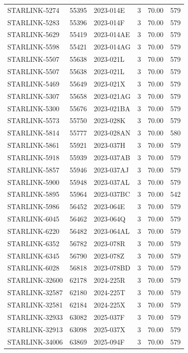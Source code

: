 \begin{longtable}{lllccc}
STARLINK-5274 & 55395 & 2023-014E & 3 & 70.00 & 579 \\
STARLINK-5283 & 55396 & 2023-014F & 3 & 70.00 & 579 \\
STARLINK-5629 & 55419 & 2023-014AE & 3 & 70.00 & 579 \\
STARLINK-5598 & 55421 & 2023-014AG & 3 & 70.00 & 579 \\
STARLINK-5507 & 55638 & 2023-021L & 3 & 70.00 & 579 \\
STARLINK-5507 & 55638 & 2023-021L & 3 & 70.00 & 579 \\
STARLINK-5469 & 55649 & 2023-021X & 3 & 70.00 & 579 \\
STARLINK-5307 & 55658 & 2023-021AG & 3 & 70.00 & 579 \\
STARLINK-5300 & 55676 & 2023-021BA & 3 & 70.00 & 579 \\
STARLINK-5573 & 55750 & 2023-028K & 3 & 70.00 & 579 \\
STARLINK-5814 & 55777 & 2023-028AN & 3 & 70.00 & 580 \\
STARLINK-5861 & 55921 & 2023-037H & 3 & 70.00 & 579 \\
STARLINK-5918 & 55939 & 2023-037AB & 3 & 70.00 & 579 \\
STARLINK-5857 & 55946 & 2023-037AJ & 3 & 70.00 & 579 \\
STARLINK-5900 & 55948 & 2023-037AL & 3 & 70.00 & 579 \\
STARLINK-5895 & 55964 & 2023-037BC & 3 & 70.00 & 542 \\
STARLINK-5986 & 56452 & 2023-064E & 3 & 70.00 & 579 \\
STARLINK-6045 & 56462 & 2023-064Q & 3 & 70.00 & 579 \\
STARLINK-6220 & 56482 & 2023-064AL & 3 & 70.00 & 579 \\
STARLINK-6352 & 56782 & 2023-078R & 3 & 70.00 & 579 \\
STARLINK-6345 & 56790 & 2023-078Z & 3 & 70.00 & 579 \\
STARLINK-6028 & 56818 & 2023-078BD & 3 & 70.00 & 579 \\
STARLINK-32600 & 62178 & 2024-225R & 3 & 70.00 & 579 \\
STARLINK-32587 & 62180 & 2024-225T & 3 & 70.00 & 579 \\
STARLINK-32581 & 62184 & 2024-225X & 3 & 70.00 & 579 \\
STARLINK-32933 & 63082 & 2025-037F & 3 & 70.00 & 579 \\
STARLINK-32913 & 63098 & 2025-037X & 3 & 70.00 & 579 \\
STARLINK-34006 & 63869 & 2025-094F & 3 & 70.00 & 579 \\

\end{longtable}
